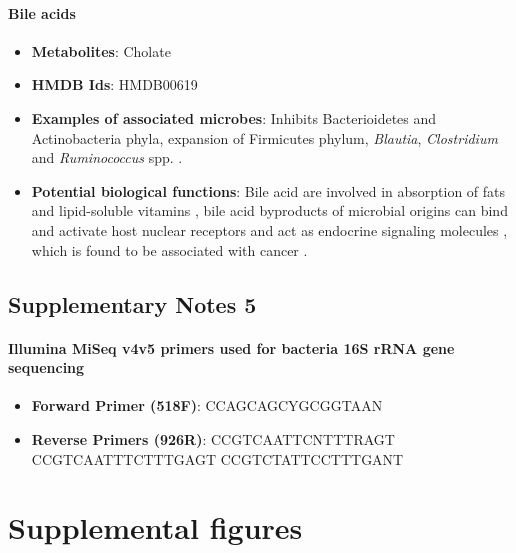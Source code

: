 \paragraph{Bile acids}  
\begin{itemize}
    \item \textbf{Metabolites}: Cholate 
    \item \textbf{HMDB Ids}: HMDB00619 
    \item \textbf{Examples of associated microbes}: Inhibits Bacterioidetes and Actinobacteria phyla, expansion of Firmicutes phylum, \emph{Blautia}, \emph{Clostridium} and \emph{Ruminococcus} spp. \cite{ridlon2014bile, islam2011bile}. 
    \item \textbf{Potential biological functions}: Bile acid are involved in absorption of fats and lipid-soluble vitamins \cite{nicholson2012hostgut}, bile acid byproducts of microbial origins can bind and activate host nuclear receptors and act as endocrine signaling molecules \cite{kawamata2003proteincoupled, hylemon2009bile}, which is found to be associated with cancer \cite{yoshimoto2013obesityinduced}. 
\end{itemize}

\subsection{Supplementary Notes 5} \label{appB_note5}
\paragraph{Illumina MiSeq v4v5 primers used for bacteria 16S rRNA gene sequencing}
\begin{itemize}
    \item \textbf{Forward Primer (518F)}: CCAGCAGCYGCGGTAAN 
    \item \textbf{Reverse Primers (926R)}: CCGTCAATTCNTTTRAGT CCGTCAATTTCTTTGAGT CCGTCTATTCCTTTGANT
\end{itemize}


\section{Supplemental figures}

